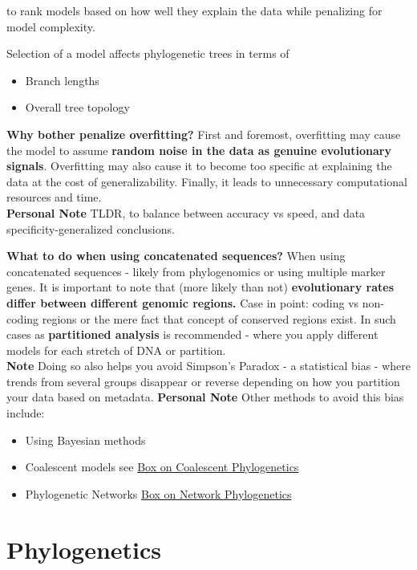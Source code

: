 \documentclass[11pt]{report}
\begin{document}
{\begin{tcolorbox}[label=box:modeltesting, colback=gray!10!white, coltitle=white, colframe=gray!80!black, title=Model Testing in Phylogenetics, breakable]
	to rank models based on how well they explain the data while penalizing for model complexity.
	
Selection of a model affects phylogenetic trees in terms of 
\begin{itemize}
	\item Branch lengths 
	\item Overall tree topology 
\end{itemize}

\textbf{Why bother penalize overfitting?}
First and foremost, overfitting may cause the model to assume \textbf{random noise in the data as genuine evolutionary signals}. Overfitting may also cause it to become too specific at explaining the data at the cost of generalizability. Finally, it leads to unnecessary computational resources and time. \\
\textbf{Personal Note} TLDR, to balance between accuracy vs speed, and data specificity-generalized conclusions. 

\textbf{What to do when using concatenated sequences?}
When using concatenated sequences - likely from phylogenomics or using multiple marker genes. It is important to note that (more likely than not) \textbf{evolutionary rates differ between different genomic regions.} Case in point: coding vs non-coding regions or the mere fact that concept of conserved regions exist.  In such cases as \textbf{partitioned analysis} is recommended - where you apply different models for each stretch of DNA or partition.\\
\textbf{Note} Doing so also helps you avoid Simpson's Paradox - a statistical bias - where trends from several groups disappear or reverse depending on how you partition your data based on metadata.
\textbf{Personal Note} Other methods to avoid this bias include:
\begin{itemize}
	\item Using Bayesian methods 
	\item Coalescent models see \hyperref[Coalescent]{Box on Coalescent Phylogenetics}
	\item Phylogenetic Networks \hyperref[Network Phylogenetics]{Box on Network Phylogenetics}
\end{itemize} 
 
	
\end{tcolorbox}


\section{Phylogenetics}
\begin{tcolorbox}[label=box:Coalescent, colback=gray!10!white, coltitle=white, colframe=gray!80!black, title=Coalescent, breakable]
	

\end{tcolorbox}}
\end{document}
